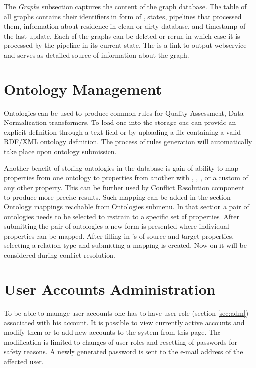 The \emph{Graphs} subsection captures the content of the graph database. The table of all graphs contains their identifiers in form of , states, pipelines that processed them, information about residence in clean or dirty database, and timestamp of the last update. Each of the graphs can be deleted or rerun in which case it is processed by the pipeline in its current state. The  is a link to output webservice and serves as detailed source of information about the graph.

\section{Ontology Management}
\label{sec:ontologyManagement}

Ontologies can be used to produce common rules for Quality Assessment, Data Normalization {transformers}. To load one into the storage one can provide an explicit definition through a text field or by uploading a file containing a valid {RDF/XML} ontology definition. The process of rules generation will automatically take place upon ontology submission.

Another benefit of storing ontologies in the database is gain of ability to map properties from one ontology to properties from another with , , ,  or a custom  of any other property. This can be further used by Conflict Resolution component to produce more precise results. Such mapping can be added in the section Ontology mappings reachable from Ontologies submenu. In that section a pair of ontologies needs to be selected to restrain to a specific set of properties. After submitting the pair of ontologies a new form is presented where individual properties can be mapped. After filling in 's of source and target properties, selecting a relation type and submitting a mapping is created. Now on it will be considered during conflict resolution.

\section{User Accounts Administration}

To be able to manage user accounts one has to have  user role (section \ref{sec:adm}) associated with his account. It is possible to view currently active accounts and modify them or to add new accounts to the system from this page. The modification is limited to changes of user roles and resetting of passwords for safety reasons. A newly generated password is sent to the e-mail address of the affected user.


